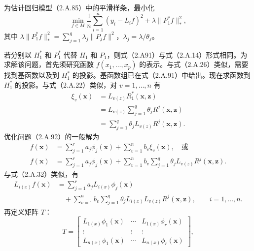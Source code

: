 为估计回归模型（2.A.85）中的平滑样条，最小化
\begin{equation}
\min_{f\in M}\frac1n\sum_{i=1}^n(y_i-L_if)^2
 +\lambda\|P_1^*f\|_*^2,\tag{2.A.92}
\end{equation}
其中 $\lambda\|P_1^*f\|_*^2=\sum_{j=1}^q\lambda_j\|P_jf\|^2$，$\lambda_j=\lambda/\theta_j$。

若分别以 $H_1^*$ 和 $P_1^*$ 代替 $H_1$ 和 $P_1$，则式（2.A91）与式（2.A.14）形式相同。为求解该问题，首先须研究函数 $f(x_1,\ldots,x_p)$ 的表示。与式（2.A.26）类似，需要找到基函数以及到 $H_1^*$ 的投影。基函数组已在式（2.A.91）中给出。现在求函数到 $H_1^*$ 的投影。与式（2.A.22）类似，对 $v=1,\ldots,n$ 有
\begin{equation}
\begin{aligned}
\xi_v(\boldsymbol x)&=L_{v(z)}R_1^*(\boldsymbol x,\boldsymbol z)\\
 &=L_{v(z)}\sum_{j=1}^q\theta_jR^j(\boldsymbol x,\boldsymbol z)\\
 &=\sum_{j=1}^q\theta_jL_{v(z)}R^j(\boldsymbol x,\boldsymbol z).
\end{aligned}\tag{2.A.93}
\end{equation}
优化问题（2.A.92）的一般解为
\begin{equation}
\begin{aligned}
f(\boldsymbol x)&=\sum_{j=1}^ra_j\phi_j(\boldsymbol x)
                 +\sum_{v=1}^nb_v\xi_v(\boldsymbol x),\quad\text{或}\\
f(\boldsymbol x)&=\sum_{j=1}^ra_j\phi_j(\boldsymbol x)
 +\sum_{v=1}^nb_v\sum_{j=1}^q\theta_jL_{v(z)}R^j(\boldsymbol x,\boldsymbol z).
\end{aligned}\tag{2.A.94}
\end{equation}
与式（2.A.32）类似，有
\begin{equation}
\begin{aligned}
L_{i(x)}f(\boldsymbol x)
 &=\sum_{j=1}^ra_jL_{i(x)}\phi_j(\boldsymbol x)\\
 &\quad+\sum_{v=1}^nb_v\sum_{j=1}^q
   \theta_jL_{i(x)}L_{v(z)}R^j(\boldsymbol x,\boldsymbol z),
 \qquad i=1,\ldots,n.
\end{aligned}\tag{2.A.95}
\end{equation}
再定义矩阵 $T$：
\[
T=\begin{bmatrix}
L_{1(x)}\phi_1(\boldsymbol x)&\cdots&L_{1(x)}\phi_r(\boldsymbol x)\\
\vdots&\vdots&\vdots\\
L_{n(x)}\phi_1(\boldsymbol x)&\cdots&L_{n(x)}\phi_r(\boldsymbol x)
\end{bmatrix},
\]

